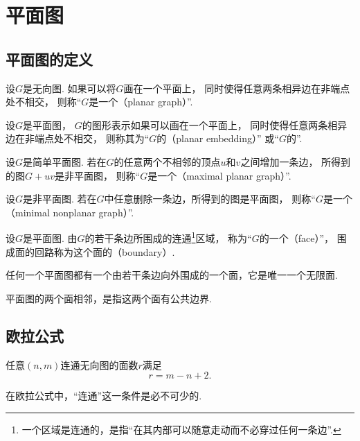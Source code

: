 \section{平面图}
\subsection{平面图的定义}
设\(G\)是无向图.
如果可以将\(G\)画在一个平面上，
同时使得任意两条相异边在非端点处不相交，
则称“\(G\)是一个（planar graph）”.

设\(G\)是平面图，
\(G\)的图形表示如果可以画在一个平面上，
同时使得任意两条相异边在非端点处不相交，
则称其为“\(G\)的（planar embedding）”
或“\(G\)的”.

\begin{definition}
设\(G\)是简单平面图.
若在\(G\)的任意两个不相邻的顶点\(u\)和\(v\)之间增加一条边，
所得到的图\(G+uv\)是非平面图，
则称“\(G\)是一个（maximal planar graph）”.
\end{definition}

\begin{definition}
设\(G\)是非平面图.
若在\(G\)中任意删除一条边，所得到的图是平面图，
则称“\(G\)是一个（minimal nonplanar graph）”.
\end{definition}

\begin{definition}
设\(G\)是平面图.
由\(G\)的若干条边所围成的连通\footnote{
	一个区域是连通的，是指“在其内部可以随意走动而不必穿过任何一条边”.
}区域，
称为“\(G\)的一个（face）”，
围成面的回路称为这个面的（boundary）.
\end{definition}
\begin{remark}
任何一个平面图都有一个由若干条边向外围成的一个面，它是唯一一个无限面.
\end{remark}

平面图的两个面相邻，是指这两个面有公共边界.

\subsection{欧拉公式}
\begin{theorem}
任意\((n,m)\)连通无向图的面数\(r\)满足\begin{equation}
	r = m - n + 2.
\end{equation}
\end{theorem}
\begin{remark}
在欧拉公式中，“连通”这一条件是必不可少的.
\end{remark}

